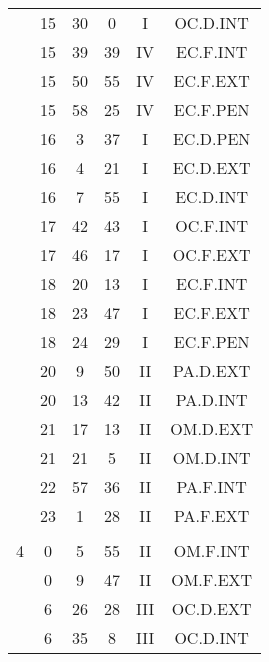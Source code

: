 \documentclass[12pt, a4paper]{article}
\begin{document}
\begin{multicols}{3}
{\begin{tabular}{c c c c c c}
	 	 	 	 & 15 & 30 & 0 & I & OC.D.INT\\%
	 	 	 	 & 15 & 39 & 39 & IV & EC.F.INT\\%
	 	 	 	 & 15 & 50 & 55 & IV & EC.F.EXT\\%
	 	 	 	 & 15 & 58 & 25 & IV & EC.F.PEN\\%
	 	 	 	 & 16 & 3 & 37 & I & EC.D.PEN\\%
	 	 	 	 & 16 & 4 & 21 & I & EC.D.EXT\\%
	 	 	 	 & 16 & 7 & 55 & I & EC.D.INT\\%
	 	 	 	 & 17 & 42 & 43 & I & OC.F.INT\\%
	 	 	 	 & 17 & 46 & 17 & I & OC.F.EXT\\%
	 	 	 	 & 18 & 20 & 13 & I & EC.F.INT\\%
	 	 	 	 & 18 & 23 & 47 & I & EC.F.EXT\\%
	 	 	 	 & 18 & 24 & 29 & I & EC.F.PEN\\%
	 	 	 	 & 20 & 9 & 50 & II & PA.D.EXT\\%
	 	 	 	 & 20 & 13 & 42 & II & PA.D.INT\\%
	 	 	 	 & 21 & 17 & 13 & II & OM.D.EXT\\%
	 	 	 	 & 21 & 21 & 5 & II & OM.D.INT\\%
	 	 	 	 & 22 & 57 & 36 & II & PA.F.INT\\%
	 	 	 	 & 23 & 1 & 28 & II & PA.F.EXT\\%
	 	 	 	 & & & & & \\%
	 	 	 	4 & 0 & 5 & 55 & II & OM.F.INT\\%
	 	 	 	 & 0 & 9 & 47 & II & OM.F.EXT\\%
	 	 	 	 & 6 & 26 & 28 & III & OC.D.EXT\\%
	 	 	 	 & 6 & 35 & 8 & III & OC.D.INT\\%

\end{tabular}}
\end{multicols}
\end{document}
